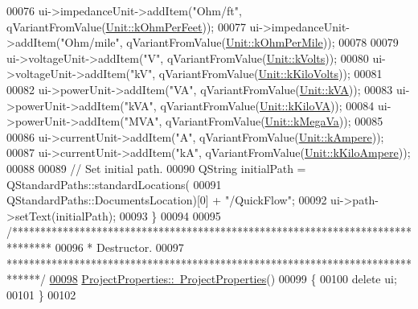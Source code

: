 \begin{DoxyCode}
00076   ui->impedanceUnit->addItem(\textcolor{stringliteral}{"Ohm/ft"}, qVariantFromValue(\hyperlink{class_unit_a3747e779c805df24a71961290be3fbdfa433b57934ca3be960ec7a60f3ea6ea87}{Unit::kOhmPerFeet}));
00077   ui->impedanceUnit->addItem(\textcolor{stringliteral}{"Ohm/mile"}, qVariantFromValue(\hyperlink{class_unit_a3747e779c805df24a71961290be3fbdfa1d5bb04c9ecda66b09891af21cd4f613}{Unit::kOhmPerMile}));
00078 
00079   ui->voltageUnit->addItem(\textcolor{stringliteral}{"V"}, qVariantFromValue(\hyperlink{class_unit_a55b07dfa9457e1eca2c7194fe0cfc3c1aa54b2473993a702a3923525765bd6e4c}{Unit::kVolts}));
00080   ui->voltageUnit->addItem(\textcolor{stringliteral}{"kV"}, qVariantFromValue(\hyperlink{class_unit_a55b07dfa9457e1eca2c7194fe0cfc3c1a35a201a658c2cd89766787c657e9a54d}{Unit::kKiloVolts}));
00081 
00082   ui->powerUnit->addItem(\textcolor{stringliteral}{"VA"}, qVariantFromValue(\hyperlink{class_unit_ace265ae255370ccacfd5370337572c3ba72b181a842ae2759488a2fa1410d3696}{Unit::kVA}));
00083   ui->powerUnit->addItem(\textcolor{stringliteral}{"kVA"}, qVariantFromValue(\hyperlink{class_unit_ace265ae255370ccacfd5370337572c3bac9e5154522fbb810d7aed75c3ff47cb2}{Unit::kKiloVA}));
00084   ui->powerUnit->addItem(\textcolor{stringliteral}{"MVA"}, qVariantFromValue(\hyperlink{class_unit_ace265ae255370ccacfd5370337572c3ba6039da0ed20f8bee64305bab8bdec365}{Unit::kMegaVa}));
00085 
00086   ui->currentUnit->addItem(\textcolor{stringliteral}{"A"}, qVariantFromValue(\hyperlink{class_unit_a0794cf6c9682f48296dd4a5315389787a368a3c470f0b590a6100dda717a7dd4f}{Unit::kAmpere}));
00087   ui->currentUnit->addItem(\textcolor{stringliteral}{"kA"}, qVariantFromValue(\hyperlink{class_unit_a0794cf6c9682f48296dd4a5315389787aa27cb5edd73099f24f2285e02396ae14}{Unit::kKiloAmpere}));
00088 
00089   \textcolor{comment}{// Set initial path.}
00090   QString initialPath = QStandardPaths::standardLocations(
00091                           QStandardPaths::DocumentsLocation)[0] + \textcolor{stringliteral}{"/QuickFlow"};
00092   ui->path->setText(initialPath);
00093 \}
00094 
00095 \textcolor{comment}{/*******************************************************************************}
00096 \textcolor{comment}{ * Destructor.}
00097 \textcolor{comment}{ ******************************************************************************/}
\hypertarget{projectproperties_8cpp_source_l00098}{}\hyperlink{group___window_ga8e0d4371b770784e85648926ded1f70a}{00098} \hyperlink{group___window_ga8e0d4371b770784e85648926ded1f70a}{ProjectProperties::~ProjectProperties}()
00099 \{
00100   \textcolor{keyword}{delete} ui;
00101 \}
00102 

\end{DoxyCode}
